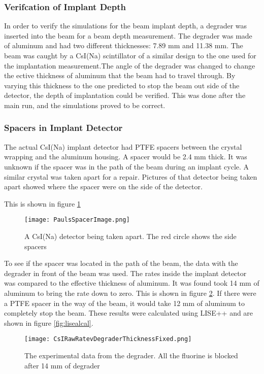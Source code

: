\documentclass[main.tex]{subfiles}
\begin{document}
\subsubsection{Verifcation of Implant Depth}

In order to verify the simulations for the beam implant depth, a degrader was inserted into the beam for a beam depth measurement.
The degrader was made of aluminum and had two different thicknesses: 7.89 mm and 11.38 mm. 
The beam was caught by a CsI(Na) scintillator of a similar design to the one used for the implantation measurement.The angle of the degrader was changed to change the ective thickness of aluminum that the beam
had to travel through. By varying this thickness to the one predicted to stop the beam out side of the detector, the depth of implantation could be verified. 
This was done after the main run, and the simulations proved to be correct.

\subsubsection{Spacers in Implant Detector}
The actual CsI(Na) implant detector had PTFE spacers between the crystal wrapping and the aluminum housing.
A spacer would be 2.4 mm thick. 
It was unknown if the spacer was in the path of the beam during an implant cycle. 
A similar crystal was taken apart for a repair. 
Pictures of that detector being taken apart showed where the spacer were on the side of the detector. 

This is shown in figure \ref{fig:detpic}

\begin{figure}[!htb]
	\centerline{\texttt{[image: PaulsSpacerImage.png]}}
	\caption{A CsI(Na) detector being taken apart.
		 The red circle shows the side spacers}
	\label{fig:detpic}
\end{figure}

To see if the spacer was located in the path of the beam, the data with the degrader in front of the beam was used.
The rates inside the implant detector was compared to the effective thickness of aluminum. 
It was found took 14 mm of aluminum to bring the rate down to zero.
This is shown in figure \ref{fig:degraderdata}.
If there were a PTFE spacer in the way of the beam, it would take 12 mm of aluminum to completely stop the beam.
These results were calculated using LISE++ and are shown in figure \ref{fig:lisealcal}.

\begin{figure}[!htb]
	\centerline{\texttt{[image: CsIRawRatevDegraderThicknessFixed.png]}}
	\caption{The experimental data from the degrader. 
		 All the fluorine is blocked after 14 mm of degrader}
	\label{fig:degraderdata}
\end{figure}
\end{document}
